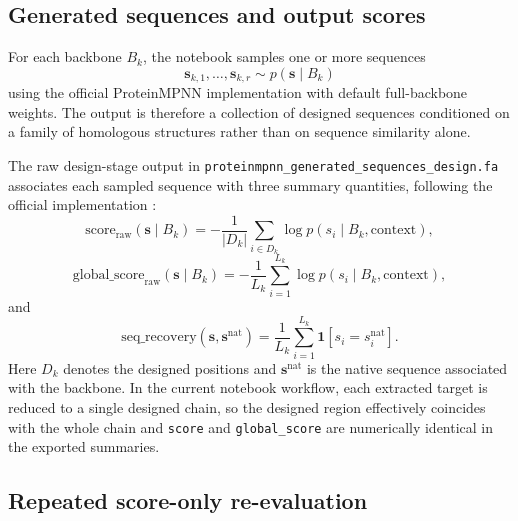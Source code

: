 \documentclass[11pt,a4paper]{article}
\begin{document}
\subsection{Generated sequences and output scores}

For each backbone $B_k$, the notebook samples one or more sequences
\[
\bm{s}_{k,1},\dots,\bm{s}_{k,r}\sim p(\bm{s}\mid B_k)
\]
using the official ProteinMPNN implementation with default full-backbone weights. The output is therefore a collection of designed sequences conditioned on a family of homologous structures rather than on sequence similarity alone.

The raw design-stage output in \texttt{proteinmpnn\_generated\_sequences\_design.fa} associates each sampled sequence with three summary quantities, following the official implementation \cite{ProteinMPNNGitHub}:
\[
\mathrm{score}_{\mathrm{raw}}(\bm{s}\mid B_k)= -\frac{1}{|D_k|}\sum_{i\in D_k}\log p(s_i\mid B_k,\text{context}),
\]
\[
\mathrm{global\_score}_{\mathrm{raw}}(\bm{s}\mid B_k)= -\frac{1}{L_k}\sum_{i=1}^{L_k}\log p(s_i\mid B_k,\text{context}),
\]
and
\[
\mathrm{seq\_recovery}(\bm{s},\bm{s}^{\mathrm{nat}})=\frac{1}{L_k}\sum_{i=1}^{L_k}\mathbf{1}\!\left[s_i=s^{\mathrm{nat}}_i\right].
\]
Here $D_k$ denotes the designed positions and $\bm{s}^{\mathrm{nat}}$ is the native sequence associated with the backbone. In the current notebook workflow, each extracted target is reduced to a single designed chain, so the designed region effectively coincides with the whole chain and \texttt{score} and \texttt{global\_score} are numerically identical in the exported summaries.

\subsection{Repeated score-only re-evaluation}
\end{document}
